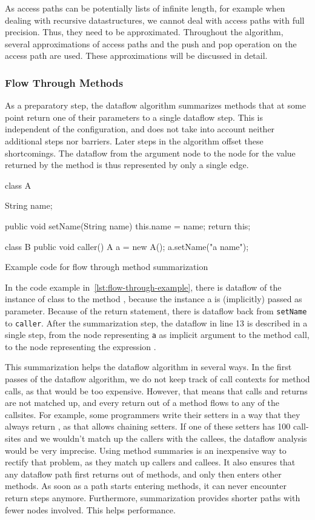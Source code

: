 As access paths can be potentially lists of infinite length, for example 
when dealing with recursive datastructures, we cannot deal with access paths 
with full precision.
Thus, they need to be approximated.
Throughout the algorithm, several approximations of access paths and the push and 
pop operation on the access path are used.
These approximations will be discussed in detail.

\subsubsection*{Flow Through Methods}
As a preparatory step, the dataflow algorithm summarizes methods that at some point 
return one of their parameters to a single dataflow step.
This is independent of the configuration, and does not take into account
neither additional steps nor barriers.
Later steps in the algorithm offset these shortcomings.
The dataflow from the argument node to the node for the value returned by
the method is thus represented by only a single edge.
\begin{listing}[H]
    \begin{javacode}
class A {
    String name;

    public void setName(String name) {
        this.name = name;
        return this;
    }
}

class B {
    public void caller() {
        A a = new A();
        a.setName("a name");
    }
}
    \end{javacode}
    \caption{Example code for flow through method summarization}    
    \label{lst:flow-through-example}
\end{listing}
In the code example in~\autoref{lst:flow-through-example}, there is dataflow of the instance
of class  to the method , because the instance a 
is (implicitly) passed as  parameter.
Because of the return statement, there is dataflow back from \texttt{setName} to
\texttt{caller}.
After the summarization step, the dataflow in line 13 is described in a single step,
from the node representing \texttt{a} as implicit argument to the method call, to the node 
representing the expression .

This summarization helps the dataflow algorithm in several ways.
In the first passes of the dataflow algorithm, we do not keep track of call contexts
for method calls, as that would be too expensive.
However, that means that calls and returns are not matched up, and every return out of 
a method flows to any of the callsites.
For example, some programmers write their setters in a way that they always return ,
as that allows chaining setters.
If one of these setters has 100 call-sites and we wouldn't match up the callers with the callees,
the dataflow analysis would be very imprecise.
Using method summaries is an inexpensive way
to rectify that problem, as they match up callers and callees.
It also ensures that any dataflow path first returns out of methods, and only
then enters other methods. As soon as a path starts entering methods, it can 
never encounter return steps anymore.
Furthermore, summarization provides shorter paths with fewer nodes involved.
This helps performance.

